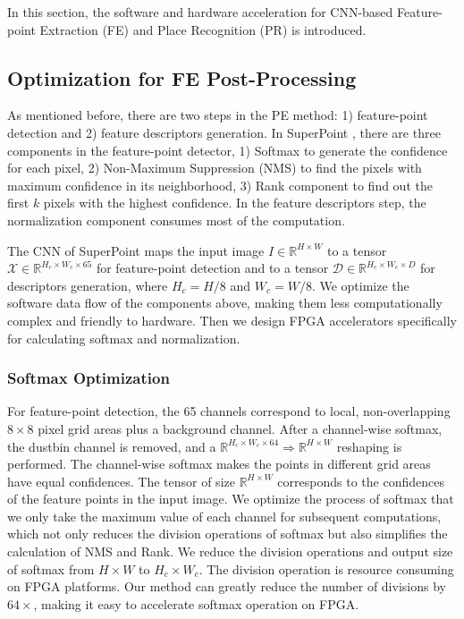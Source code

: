 \label{sec:hardsoftcodesign}
In this section, the software and hardware acceleration for CNN-based Feature-point Extraction (FE) and Place Recognition (PR) is introduced.

\subsection{Optimization for FE Post-Processing}

As mentioned before, there are two steps in the PE method: 1) feature-point detection and 2) feature descriptors generation. 
In SuperPoint \cite{detone2018superpoint}, there are three components in the feature-point detector, 1) Softmax to generate the confidence for each pixel, 2) Non-Maximum Suppression (NMS) to find the pixels with maximum confidence in its neighborhood, 3) Rank component to find out the first $k$ pixels with the highest confidence. 
In the feature descriptors step, the normalization component consumes most of the computation. 

The CNN of SuperPoint maps the input image $I\in \mathbb{R}^{H\times W}$ to a tensor $\mathcal{X}\in \mathbb{R}^{H_c\times W_c\times 65}$ for feature-point detection and to a tensor $\mathcal{D}\in \mathbb{R}^{H_c\times W_c\times D}$ for descriptors generation, where $H_c = H/8$ and $W_c = W/8$.
We optimize the software data flow of the components above, making them less computationally complex and friendly to hardware. 
Then we design FPGA accelerators specifically for calculating softmax and normalization.

\subsubsection{Softmax Optimization}
\label{sec:softmaxopt}

For feature-point detection, the 65 channels correspond to local, non-overlapping $8 \times 8$ pixel grid areas plus a background channel. 
After a channel-wise softmax, the dustbin channel is removed, and a $\mathbb{R}^{H_c\times W_c\times64}\Rightarrow \mathbb{R}^{H\times W}$ reshaping is performed. 
The channel-wise softmax makes the points in different grid areas have equal confidences.
The tensor of size $\mathbb{R}^{H\times W}$ corresponds to the confidences of the feature points in the input image.
We optimize the process of softmax that we only take the maximum value of each channel for subsequent computations, which not only reduces the division operations of softmax but also simplifies the calculation of NMS and Rank.
We reduce the division operations and output size of softmax from $H \times W$ to $H_c \times W_c$.
The division operation is resource consuming on FPGA platforms. 
Our method can greatly reduce the number of divisions by $64 \times$, making it easy to accelerate softmax operation on FPGA.

